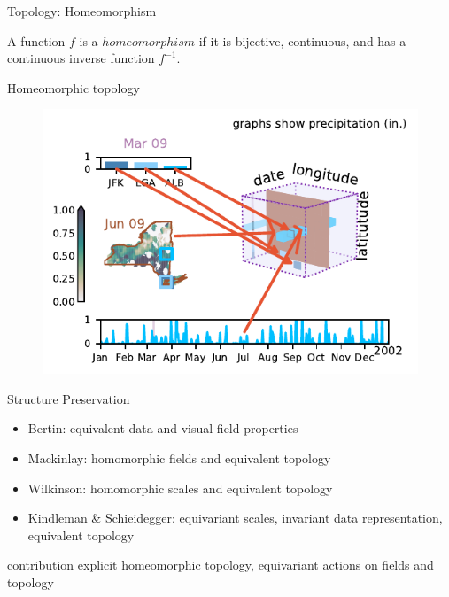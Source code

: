 \documentclass[xcolor={dvipsnames}]{beamer}
\begin{document}
\begin{frame}{Topology: Homeomorphism}

    \begin{definition}
        A function $f$ is a $homeomorphism$ if it is bijective, continuous, and has a continuous inverse function $f^{-1}$.
      \end{definition}
\end{frame}

\begin{frame}{Homeomorphic topology}
    \begin{figure}
        \includegraphics[width=\linewidth]{../paper/figures/k_different_types.pdf}
    \end{figure}
\end{frame}


\begin{frame}{Structure Preservation}
    \begin{itemize}
        \item Bertin: equivalent data and visual field properties \cite{bertinSemiologyGraphicsDiagrams2011}
        \item Mackinlay: homomorphic fields and equivalent topology \cite{mackinlayAutomaticDesignGraphical1987}
        \item Wilkinson: homomorphic scales and  equivalent topology \cite{wilkinsonGrammarGraphics2005}
        \item Kindleman  \& Schieidegger: equivariant scales, invariant data representation, equivalent topology \cite{kindlmannAlgebraicProcessVisualization2014}
    \end{itemize}
    \begin{block}{contribution}
    explicit homeomorphic topology, equivariant actions on fields and topology
    \end{block}
\end{frame}
\end{document}
